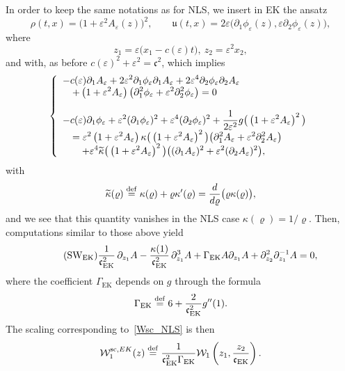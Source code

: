 \documentclass[AHL,Unicode,longabstracts,published]{cedram}
\newcommand*\p{\partial}
\newcommand*\ddef{\stackrel{\rm def}{=}}
\renewcommand{\sc}{\mathrm{sc}}
\newcommand{\EK}{\mathrm{EK}}
\newcommand*\BW{\mathcal{W}}
\newcommand*\ds{\displaystyle}
\newcommand*\cs{{\mathfrak c}}
\renewcommand*\u{\mathfrak{u}}
\newcommand*\e{\varepsilon}
\renewcommand*\t{\tilde}
\newcommand*\G{\Gamma}
\let\oldtilde\tilde
\renewcommand*{\tilde}[1]{\mathchoice{\widetilde{#1}}{\widetilde{#1}}{\oldtilde{#1}}{\oldtilde{#1}}}
\begin{document}
In order to keep the same notations as for NLS, we insert in EK the ansatz
\[
\rho (t, x) = \big(1 + \e^2 A_\e (z) \big)^2,
\quad \quad
\u (t, x) = 2 \e \big(\p_1 \phi_\e (z), \e \p_2 \phi_\e (z) \big),
\]
where
\[
z_1 = \e \big(x_1 - c(\e) t \big), \ z_2 = \e^2 x_2,
\]
and with, as before $ c(\e)^2 + \e^2 = \cs^2 $, which implies
\begin{equation}\label{MadTW_EK}
\left\{
\begin{array}{ll}
\ds{ - c(\e) \p_{1} A_\e + 2 \e^2 \p_{1} \phi_\e \p_{1} A_\e + 2 \e^4 \p_{2} \phi_\e \p_{2} A_\e }
\\ \quad
\ds{ + \left(1 + \e^2 A_\e\right) \big(\p_{1}^2 \phi_\e +
\e^2 \p^2_{2} \phi_\e \big)} = 0 \\ \ \\
\ds{ - c(\e) \p_{1} \phi_\e + \e^2 (\p_{1} \phi_\e)^2 + \e^4 (\p_{2} \phi_\e)^2 + \frac{1}{2 \e^2} g\big(\left(1 +\e^2 A_\e\right)^2 \big) }
\\ \quad
\ds{ =
\e^2 \left(1+\e^2 A_\e\right) \kappa \big(\left(1+\e^2 A_\e\right)^2 \big) \big(\p_{1}^2 A_\e + \e^2 \p_{2}^2 A_\e \big) }
\\ \quad \quad
\ds{ + \e^4 \t\kappa \big(\left(1+\e^2 A_\e\right)^2 \big) \big((\p_{1} A_\e)^2 + \e^2 (\p_{2} A_\e)^2 \big), }
\end{array}\right.
\end{equation} 
with
\[
\t\kappa (\varrho) \ddef
\kappa (\varrho) + \varrho \kappa' (\varrho) = \frac{d}{d \varrho} \big(\varrho \kappa (\varrho) \big),
\]
and we see that this quantity vanishes in the NLS case $ \kappa (\varrho) = 1/ \varrho $. Then, computations similar to those above yield
\begin{equation}
\tag{SW$_{\EK}$}
\frac{1}{\cs_{\EK}^2}\, \p_{z_1} A - \frac{\kappa(1)}{\cs_{\EK}^2} \, \p^3_{z_1} A + \G_{\EK} A \p_{z_1} A + \p_{z_2}^2 \p_{z_1}^{-1} A = 0,
\end{equation} where the coefficient $ \G_{\EK} $ depends on $ g$ through the formula
\[
\G_{\EK} \ddef 6 + \frac{2}{\cs_{\EK}^2} g''(1).
\]
The scaling corresponding to~\eqref{Wsc_NLS} is then
\begin{equation}\label{Wsc_EK}
\BW_1^{\sc, EK} (z) \ddef \frac{1}{\cs_{\EK}^2 \G_{\EK}} \BW_1 \left(z_1, \frac{z_2}{\cs_{\EK}} \right).
\end{equation}
\end{document}
